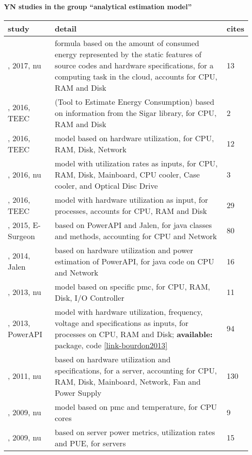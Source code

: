 \paragraph{YN studies in the group ``analytical estimation model''} 
 \label{tab:YN-analytical-estimation-model} 
\begin{longtable}{|>{\raggedright\arraybackslash}p{2.75cm}|p{11.75cm}|p{0.7cm}|}
\toprule
\bfseries study & \bfseries detail & \bfseries cites \\
\midrule 
\endhead
\cite{liu2017}, 2017, \acrshort{nu} & formula based on the amount of consumed energy represented by the static features of source codes and hardware specifications, for a computing task in the cloud, accounts for CPU, RAM and Disk & 13 \\
\cite{acar2016c}, 2016, TEEC &  (Tool to Estimate Energy Consumption) based on information from the Sigar library, for CPU, RAM and Disk & 2 \\
\cite{acar2016b}, 2016, TEEC & model based on hardware utilization, for CPU, RAM, Disk, Network & 12 \\
\cite{park2016}, 2016, \acrshort{nu} & model with utilization rates as inputs, for CPU, RAM, Disk, Mainboard, CPU cooler, Case cooler, and Optical Disc Drive & 3 \\
\cite{acar2016a}, 2016, TEEC & model with hardware utilization as input, for processes, accounts for CPU, RAM and Disk & 29 \\
\cite{noureddine2015}, 2015, E-Surgeon & based on PowerAPI and Jalen, for java classes and methods, accounting for CPU and Network & 80 \\
\cite{noureddine2014a}, 2014, Jalen & based on hardware utilization and power estimation of PowerAPI, for java code on CPU and Network & 16 \\
\cite{peng2013}, 2013, \acrshort{nu} & model based on specific \acrshort{pmc}, for CPU, RAM, Disk, I/O Controller & 11 \\
\cite{bourdon2013}, 2013, PowerAPI & model with hardware utilization, frequency, voltage and specifications as inputs, for processes on CPU, RAM and Disk; \textbf{available:} package, code \href{https://github.com/powerapi-ng/powerapi}{\ref*{link-bourdon2013}} & 94 \\
\cite{basmadjian2011}, 2011, \acrshort{nu} & based on hardware utilization and specifications, for a server, accounting for CPU, RAM, Disk, Mainboard, Network, Fan and Power Supply & 130 \\
\cite{singh2009}, 2009, \acrshort{nu} & model based on \acrshort{pmc} and temperature, for CPU cores & 9 \\
\cite{spellmann2009}, 2009, \acrshort{nu} & based on server power metrics, utilization rates and PUE, for servers & 15 \\
\bottomrule
\end{longtable}
